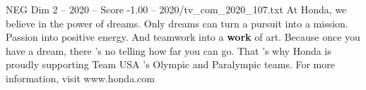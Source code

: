\begin{textsample}{NEG Dim 2 – 2020 – Score -1.00 – 2020/tv\_com\_2020\_107.txt}  \label{ex:f2_neg_040}
At Honda, we believe in the power of dreams.
Only dreams can turn a pursuit into a mission.
Passion into positive energy.
And teamwork into a \textbf{work} of art.
Because once you have a dream, there 's no telling how far you can go.
That 's why Honda is proudly supporting Team USA 's Olympic and Paralympic teams.
For more information, visit www.honda.com

\end{textsample}

